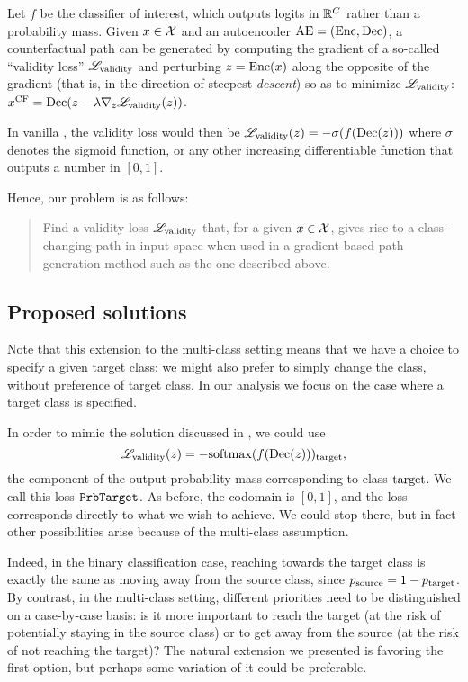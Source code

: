 \documentclass[../main.tex]{subfiles}
\begin{document}
Let $f$ be the classifier of interest, which outputs logits in $\mathbb{R}^C$ rather than a probability mass.
Given $x \in \mathcal{X}$ and an autoencoder $\mathrm{AE} = (\operatorname{Enc}, \operatorname{Dec})$, a counterfactual path can be generated by computing the gradient of a so-called ``validity loss'' $\mathscr{L}_\text{validity}$ and perturbing $z = \operatorname{Enc}(x)$ along the opposite of the gradient (that is, in the direction of steepest \emph{descent}) so as to minimize $\mathscr{L}_\text{validity}$:
$x^\mathrm{CF} = \operatorname{Dec}(z - \lambda \nabla_z \mathscr{L}_\text{validity}(z))$.

In vanilla \ls{}, the validity loss would then be $\mathscr{L}_\text{validity}(z) = - \sigma(f(\operatorname{Dec}(z)))$ where $\sigma$ denotes the sigmoid function, or any other increasing differentiable function that outputs a number in $[0, 1]$.

Hence, our problem is as follows:
\begin{quote}
Find a validity loss $\mathscr{L}_\text{validity}$ that, for a given $x \in \mathcal{X}$, gives rise to a class-changing path in input space when used in a gradient-based path generation method such as the one described above.
\end{quote}

\subsection{Proposed solutions}
\label{sec:validity_losses}

Note that this extension to the multi-class setting means that we have a choice to specify a given target class: we might also prefer to simply change the class, without preference of target class. In our analysis we focus on the case where a target class is specified.

In order to mimic the solution discussed in \cite{cohenGifsplanation2022}, we could use
\begin{equation}
    \mathscr{L}_\text{validity}(z) = -\mathrm{softmax}(f(\operatorname{Dec}(z)))_{\mathrm{target}},
\end{equation}
\ie{} the component of the output probability mass corresponding to class $\mathrm{target}$.
We call this loss $\mathtt{PrbTarget}$.
As before, the codomain is $[0, 1]$, and the loss corresponds directly to what we wish to achieve.
We could stop there, but in fact other possibilities arise because of the multi-class assumption.

Indeed, in the binary classification case, reaching towards the target class is exactly the same as moving away from the source class, since $p_{\mathrm{source}} = 1 - p_{\mathrm{target}}$.
By contrast, in the multi-class setting, different priorities need to be distinguished on a case-by-case basis: is it more important to reach the target (at the risk of potentially staying in the source class) or to get away from the source (at the risk of not reaching the target)?
The natural extension we presented is favoring the first option, but perhaps some variation of it could be preferable.
\end{document}
